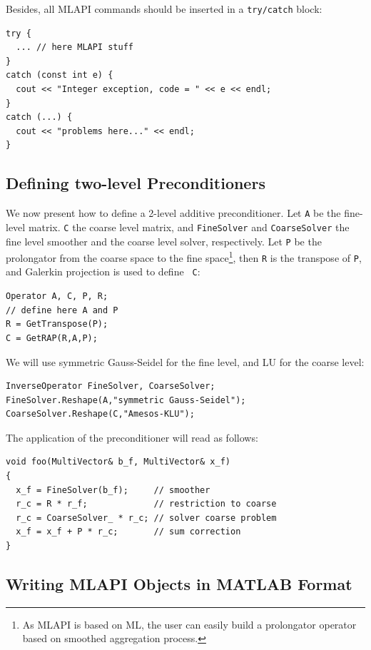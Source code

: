 \documentclass{article}[11pt]
\newcommand{\MLAPI}  {{\sc MLAPI }}
\begin{document}
Besides, all \MLAPI commands should be inserted
in a {\tt try/catch} block:
\begin{verbatim}
try {
  ... // here MLAPI stuff
}
catch (const int e) {
  cout << "Integer exception, code = " << e << endl;
} 
catch (...) {
  cout << "problems here..." << endl;
}
\end{verbatim}

\subsection{Defining two-level Preconditioners}
\label{sec:two-level}

We now present how to define a 2-level additive
preconditioner. Let {\tt A} be the fine-level matrix.
{\tt C}  the coarse level matrix,
and {\tt FineSolver} and {\tt CoarseSolver} 
the fine level smoother and the coarse level solver,
respectively. Let {\tt P} be the prolongator from the coarse space to the fine
space\footnote{As \MLAPI is based on ML, the user can easily build a
  prolongator operator based on smoothed aggregation process.}, then {\tt R}
  is the transpose of {\tt P}, and Galerkin projection is used to define {\tt
    C}:
\begin{verbatim}
Operator A, C, P, R;
// define here A and P
R = GetTranspose(P);
C = GetRAP(R,A,P);
\end{verbatim} 
We will use symmetric Gauss-Seidel
for the fine level, and LU for the coarse level:
\begin{verbatim}
InverseOperator FineSolver, CoarseSolver;
FineSolver.Reshape(A,"symmetric Gauss-Seidel");
CoarseSolver.Reshape(C,"Amesos-KLU");
\end{verbatim}
The application of the preconditioner will read as follows:
\begin{verbatim}
void foo(MultiVector& b_f, MultiVector& x_f)
{
  x_f = FineSolver(b_f);     // smoother
  r_c = R * r_f;             // restriction to coarse
  r_c = CoarseSolver_ * r_c; // solver coarse problem
  x_f = x_f + P * r_c;       // sum correction
}
\end{verbatim}

\subsection{Writing \MLAPI Objects in MATLAB Format}
\label{sec:matlab}
\end{document}
